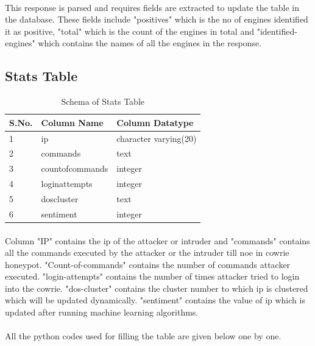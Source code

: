 \documentclass{report}
\begin{document}


\paragraph{}
This response is parsed and requires fields are extracted to update the table in the database. These fields include "positives" which is the no of engines identified it as positive, "total" which is the count of the engines in total  and "identified-engines" which contains the names of all the engines in the response.


\subsection{Stats Table}

\begin{table}[H]
\begin{tabular}{ |p{2cm}|p{5cm}|p{5cm}|  }
 \hline
 \textbf{S.No.} & \textbf{Column Name} & \textbf{Column Datatype}\\
 \hline
 \hline
 1 & ip & character varying(20) \\
 \hline
2 & commands & text \\
\hline
3 & countofcommands & integer \\
\hline
4 & loginattempts & integer \\
\hline
5 & doscluster & text \\
\hline
6 & sentiment & integer \\
\hline
\end{tabular}
 \caption{Schema of Stats Table}
\end{table}

 
\paragraph{}
Column "IP" contains the ip of the attacker or intruder and "commands" contains all the commands executed by the attacker or the intruder till noe in cowrie honeypot. "Count-of-commands" contains the number of commands attacker executed. "login-attempts" contains the number of times attacker tried to login into the cowrie. "dos-cluster" contains the cluster number to which ip is clustered which will be updated dynamically. "sentiment" contains the value of ip which is updated after running machine learning algorithms.

\paragraph{}
All the python codes used for filling the table are given below one by one.
\end{document}
